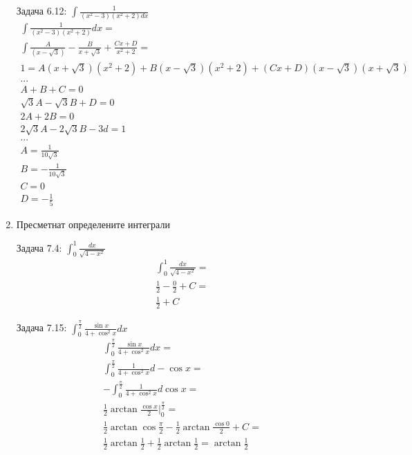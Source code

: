 \documentclass[a4paper, 20pt, fleqn, border=2pt]{article}
\begin{document}
\begin{enumerate}
Задача 6.12: $\int \frac{1}{(x^2 - 3)(x^2 + 2)dx}$
\begin{equation}
\begin{split}
    \int \frac{1}{(x^2 - 3)(x^2 + 2)}dx = \\
    \int \frac{A}{(x - \sqrt{3})} - \frac{B}{x + \sqrt{3}} + \frac{Cx + D}{x^2 + 2} = \\
    1 = A(x + \sqrt{3})(x^2 + 2) + B(x - \sqrt{3})(x^2 + 2) + (Cx + D)(x - \sqrt{3})(x + \sqrt{3}) \\
    \text{...} \\
    A + B + C = 0 \\
    \sqrt{3}A - \sqrt{3}B + D = 0 \\
    2A + 2B = 0 \\
    2\sqrt{3}A - 2\sqrt{3}B - 3d = 1 \\
    \text{...} \\
    A = \frac{1}{10\sqrt{3}} \\
    B = -\frac{1}{10\sqrt{3}} \\
    C = 0 \\
    D = -\frac{1}{5} 
\end{split}
\end{equation}

    \item Пресметнат определените интеграли
\par
\par

Задача 7.4: $\int^{1}_0\frac{dx}{\sqrt{4 - x^2}}$
\begin{equation}
\begin{split}
    \int^{1}_0\frac{dx}{\sqrt{4 - x^2}} = \\
    \frac{1}{2} - \frac{0}{2} + C = \\
    \frac{1}{2} + C
\end{split}
\end{equation}

Задача 7.15: $\int_{0}^{\frac{\pi}{2}}\frac{\sin{x}}{4 + \cos^2{x}}dx$
\begin{equation}
\begin{split}
    \int_{0}^{\frac{\pi}{2}}\frac{\sin{x}}{4 + \cos^2{x}}dx = \\
    \int_{0}^{\frac{\pi}{2}}\frac{1}{4 + \cos^2{x}}d-\cos{x} = \\
    -\int_{0}^{\frac{\pi}{2}}\frac{1}{4 + \cos^2{x}}d\cos{x} = \\
    \frac{1}{2}\arctan\frac{\cos{x}}{2}|_{0}^{\frac{\pi}{2}} = \\
    \frac{1}{2}\arctan{\cos{\frac{\pi}{2}}} - \frac{1}{2}\arctan\frac{\cos{0}}{2} + C = \\
    \frac{1}{2}\arctan\frac{1}{2} + \frac{1}{2}\arctan{\frac{1}{2}} = \arctan\frac{1}{2}
\end{split}
\end{equation}


\end{enumerate}
\end{document}
